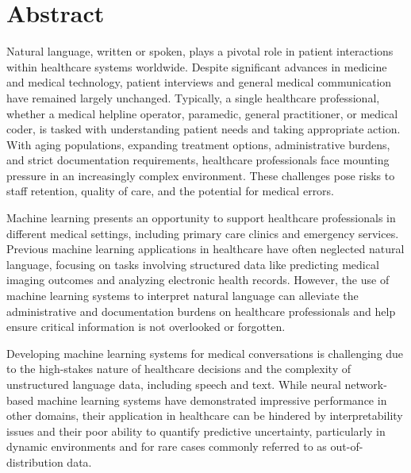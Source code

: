 
\chapter[abstract]{Abstract}

Natural language, written or spoken, plays a pivotal role in patient interactions within healthcare systems worldwide.
Despite significant advances in medicine and medical technology, patient interviews and general medical communication have remained largely unchanged. 
Typically, a single healthcare professional, whether a medical helpline operator, paramedic, general practitioner, or medical coder, is tasked with understanding patient needs and taking appropriate action. 
With aging populations, expanding treatment options, administrative burdens, and strict documentation requirements, healthcare professionals face mounting pressure in an increasingly complex environment. 
These challenges pose risks to staff retention, quality of care, and the potential for medical errors.

Machine learning presents an opportunity to support healthcare professionals in different medical settings, including primary care clinics and emergency services. Previous machine learning applications in healthcare have often neglected natural language, focusing on tasks involving structured data like predicting medical imaging outcomes and analyzing electronic health records. However, the use of machine learning systems to interpret natural language can alleviate the administrative and documentation burdens on healthcare professionals and help ensure critical information is not overlooked or forgotten.

Developing machine learning systems for medical conversations is challenging due to the high-stakes nature of healthcare decisions and the complexity of unstructured language data, including speech and text. While neural network-based machine learning systems have demonstrated impressive performance in other domains, their application in healthcare can be hindered by interpretability issues and their poor ability to quantify predictive uncertainty, particularly in dynamic environments and for rare cases commonly referred to as out-of-distribution data.

